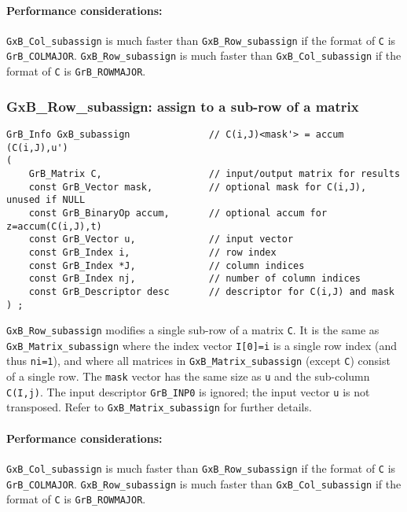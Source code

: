 \documentclass[12pt]{article}
\begin{document}
\paragraph{\bf Performance considerations:} %
\verb'GxB_Col_subassign' is much faster than \verb'GxB_Row_subassign' if the
format of \verb'C' is \verb'GrB_COLMAJOR'.  \verb'GxB_Row_subassign' is much
faster than \verb'GxB_Col_subassign' if the format of \verb'C' is
\verb'GrB_ROWMAJOR'.

\subsubsection{{\sf GxB\_Row\_subassign:} assign to a sub-row of a matrix}
\label{subassign_row}

\begin{mdframed}[userdefinedwidth=6in]
{\footnotesize
\begin{verbatim}
GrB_Info GxB_subassign              // C(i,J)<mask'> = accum (C(i,J),u')
(
    GrB_Matrix C,                   // input/output matrix for results
    const GrB_Vector mask,          // optional mask for C(i,J), unused if NULL
    const GrB_BinaryOp accum,       // optional accum for z=accum(C(i,J),t)
    const GrB_Vector u,             // input vector
    const GrB_Index i,              // row index
    const GrB_Index *J,             // column indices
    const GrB_Index nj,             // number of column indices
    const GrB_Descriptor desc       // descriptor for C(i,J) and mask
) ;
\end{verbatim} } \end{mdframed}

\verb'GxB_Row_subassign' modifies a single sub-row of a matrix \verb'C'.  It is
the same as \verb'GxB_Matrix_subassign' where the index vector \verb'I[0]=i' is
a single row index (and thus \verb'ni=1'), and where all matrices in
\verb'GxB_Matrix_subassign' (except \verb'C') consist of a single row.  The
\verb'mask' vector has the same size as \verb'u' and the sub-column
\verb'C(I,j)'.  The input descriptor \verb'GrB_INP0' is ignored; the input
vector \verb'u' is not transposed.  Refer to \verb'GxB_Matrix_subassign' for
further details.

\paragraph{\bf Performance considerations:} %
\verb'GxB_Col_subassign' is much faster than \verb'GxB_Row_subassign' if the
format of \verb'C' is \verb'GrB_COLMAJOR'.  \verb'GxB_Row_subassign' is much
faster than \verb'GxB_Col_subassign' if the format of \verb'C' is
\verb'GrB_ROWMAJOR'.
\end{document}
